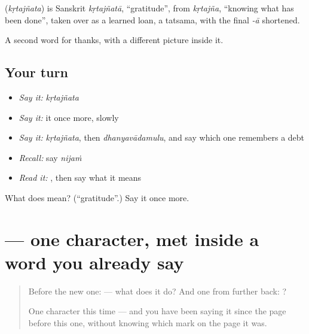 \begin{cousinweb}
\textbf{} (\emph{kṛtajñata}) is Sanskrit \emph{kṛtajñatā}, \textquotedblleft{}gratitude\textquotedblright{}, from \emph{kṛtajña}, \textquotedblleft{}knowing what has been done\textquotedblright{}, taken over as a learned loan, a tatsama, with the final \emph{-ā} shortened.
\end{cousinweb}

\begin{grammarlens}[title={What you've built}]
A second word for thanks, with a different picture inside it.
\end{grammarlens}

\subsection*{Your turn}
\begin{itemize}
\raggedright
  \item \emph{Say it:} \emph{kṛtajñata}
  \item \emph{Say it:} it once more, slowly
  \item \emph{Say it:} \emph{kṛtajñata}, then \emph{dhanyavādamulu}, and say which one remembers a debt
  \item \emph{Recall:} say \emph{nijaṁ}
  \item \emph{Read it:} \textbf{}, then say what it means
\end{itemize}

\begin{tcolorbox}[breakable,colback=teal!4,colframe=teal!35!black,title={Before you move on}]
What does  mean? (\textquotedblleft{}gratitude\textquotedblright{}.) Say it once more.
\end{tcolorbox}
\section[\texorpdfstring{\te{ఞ} (ña)}{ఞ (ña)}]{ — one character, met inside a word you already say}

\label{lesson:TE-S132-letter-nya}



\begin{quote}
Before the new one:  — what does it do? And one from further back: ?

One character this time — and you have been saying it since the page before this one, without knowing which mark on the page it was.
\end{quote}

